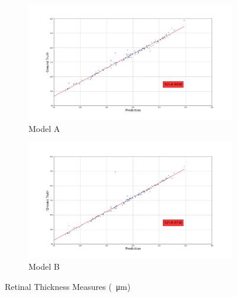 \documentclass[12pt,a4paper]{scrartcl}
\begin{document}
\begin{figure}[H]
\centering
\begin{subfigure}{1\textwidth}
  \centering
  \includegraphics[width=\linewidth]{./results/model_A_retinal_thickness.png}
  \caption{Model A}
  \label{fig:model_a_retinal_thickness}
\end{subfigure}
\begin{subfigure}{1\textwidth}
  \centering
  \includegraphics[width=\linewidth]{./results/model_B_retinal_thickness.png}
  \caption{Model B}
  \label{fig:model_b_retinal_thickness}
\end{subfigure}
\caption{Retinal Thickness Measures (\SI{}{\micro\metre})}
\label{fig:retinal_thickness_scatterplots}
\end{figure}
\end{document}
